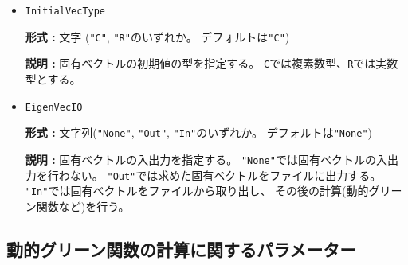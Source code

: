 \begin{itemize}
\item \verb|InitialVecType|

  {\bf 形式 :} 文字 (\verb|"C"|, \verb|"R"|のいずれか。
  デフォルトは\verb|"C"|)

  {\bf 説明 :} 固有ベクトルの初期値の型を指定する。
  \verb|C|では複素数型、\verb|R|では実数型とする。

\item \verb|EigenVecIO|
  
  {\bf 形式 :} 文字列(\verb|"None"|, \verb|"Out"|, \verb|"In"|のいずれか。
  デフォルトは\verb|"None"|)

  {\bf 説明 :} 固有ベクトルの入出力を指定する。
  \verb|"None"|では固有ベクトルの入出力を行わない。
  \verb|"Out"|では求めた固有ベクトルをファイルに出力する。
  \verb|"In"|では固有ベクトルをファイルから取り出し、
  その後の計算(動的グリーン関数など)を行う。

\end{itemize}

\subsection{動的グリーン関数の計算に関するパラメーター}

